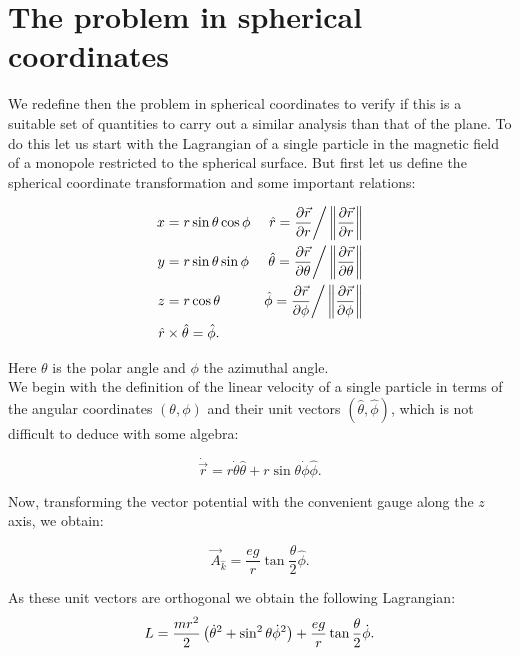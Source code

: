 \section{The problem in spherical coordinates}
We redefine then the problem in spherical coordinates to verify if this is a suitable set of quantities to carry out a similar analysis than that of the plane. To do this let us start with the Lagrangian of a single particle in the magnetic field of a monopole restricted to the spherical surface. But first let us define the spherical coordinate transformation and some important relations:

\begin{align*}
x &= r\sin{\theta}\cos{\phi} & \hat{r} = \frac{\partial \vec{r}}{\partial r}\bigg/\left\lVert \frac{\partial \vec{r}}{\partial r} \right\rVert\\
y &= r\sin{\theta}\sin{\phi} & \hat{\theta} = \frac{\partial \vec{r}}{\partial \theta}\bigg/\left\lVert \frac{\partial \vec{r}}{\partial \theta} \right\rVert \\
z &= r\cos{\theta} & \hat{\phi} = \frac{\partial \vec{r}}{\partial \phi}\bigg/\left\lVert \frac{\partial \vec{r}}{\partial \phi} \right\rVert\\
\hat{r}&\times \hat{\theta} = \hat{\phi}.
\end{align*}

Here $\theta$ is the polar angle and $\phi$ the azimuthal angle.\\

We begin with the definition of the  linear velocity of a single particle in terms of the angular coordinates $(\theta,\phi)$ and their unit vectors $(\hat{\theta},\hat{\phi})$, which is not difficult to deduce with some algebra:

\begin{equation}
\dot{\vec{r}} = r\dot{\theta}\hat{\theta} + r\sin{\theta}\dot{\phi}\hat{\phi}.
\end{equation}

Now, transforming the vector potential with the convenient gauge along the $z$ axis, we obtain:

\begin{equation*}
\vec{A}_{\hat{k}} = \frac{eg}{r}\tan{\frac{\theta}{2}}\hat{\phi}.
\end{equation*}

As these unit vectors are orthogonal we obtain the following Lagrangian:\\

\begin{equation*}
L = \frac{mr^2}{2}\left( \dot{\theta}^2 + \sin^2\theta \dot{\phi}^2 \right) + \frac{eg}{r}\tan{\frac{\theta}{2}\dot{\phi}}.
\end{equation*}

